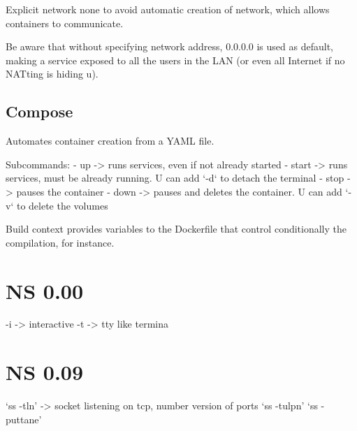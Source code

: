  Explicit network none to avoid automatic creation of network, which allows containers to communicate.

 Be aware that without specifying network address, 0.0.0.0 is used as default, making a service exposed to all the users in the LAN (or even all Internet if no NATting is hiding u).

\subsection{Compose}
Automates container creation from a YAML file.

Subcommands:
 - up -> runs services, even if not already started
 - start -> runs services, must be already running. U can add `-d` to detach the terminal
 - stop -> pauses the container
 - down -> pauses and deletes the container. U can add `-v` to delete the volumes

Build context provides variables to the Dockerfile that control conditionally the compilation, for instance.

\section{NS 0.00}
-i -> interactive
-t -> tty like termina

\section{NS 0.09}
`ss -tln' -> socket listening on tcp, number version of ports
`ss -tulpn'
`ss -puttane'